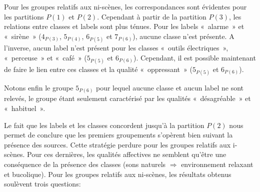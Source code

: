 Pour les groupes relatifs aux ni-scènes, les correspondances sont évidentes pour les partitions $P(1)$ et $P(2)$. Cependant à partir de la partition $P(3)$, les relations entre classes et labels sont plus ténues. Pour les labels «~alarme~» et «~sirène~» ($4_{P(3)}$, $5_{P(4)}$, $6_{P(5)}$ et $7_{P(6)}$), aucune classe n'est présente. A l'inverse, aucun label n'est présent pour les classes «~outils électriques~», «~perceuse~» et  «~café~» ($5_{P(5)}$ et $6_{P(6)}$). Cependant, il est possible maintenant de faire le lien entre ces classes et la qualité «~oppressant~» ($5_{P(5)}$ et $6_{P(6)}$).

Notons enfin le groupe $5_{P(6)}$ pour lequel aucune classe et aucun label ne sont relevés, le groupe étant seulement caractérisé par les qualités «~désagréable~» et «~habituel~».

Le fait que les labels et les classes concordent jusqu'à la partition $P(2)$ nous permet de conclure que les premiers groupements s'opèrent bien suivant la présence des sources. Cette stratégie perdure pour les groupes relatifs aux i-scènes. Pour ces dernières, les qualités affectives ne semblent qu'être une conséquence de la présence des classes (sons naturels $\Rightarrow$ environnement relaxant et bucolique). Pour les groupes relatifs aux ni-scènes, les résultats obtenus soulèvent trois questions:

